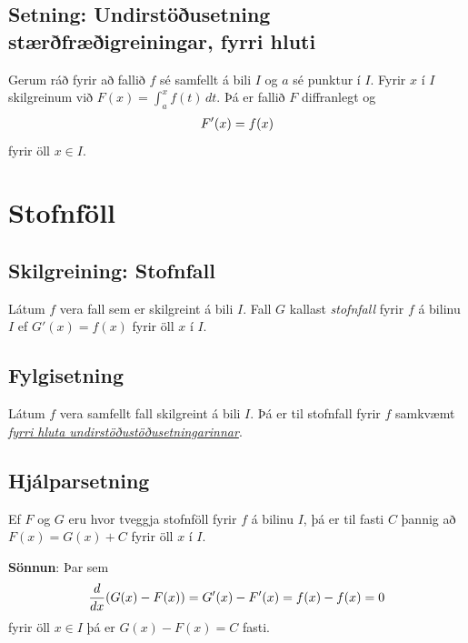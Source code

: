 \documentclass[a4paper,10pt,icelandic]{sphinxmanual}
\begin{document}

\subsection{Setning: Undirstöðusetning stærðfræðigreiningar, fyrri hluti}
\label{kafli06:undirstodusetning-fyrri}\label{kafli06:setning-undirstousetning-staerfraeigreiningar-fyrri-hluti}\label{kafli06:index-6}
Gerum ráð fyrir að fallið \(f\) sé samfellt á bili \(I\) og
\(a\) sé punktur í \(I\). Fyrir \(x\) í \(I\)
skilgreinum við \(F(x)=\int_a^x f(t)\,dt\). Þá er fallið \(F\)
diffranlegt og
\begin{gather}
\begin{split}F'(x)=f(x)\end{split}\notag
\end{gather}
fyrir öll \(x\in I\).


\section{Stofnföll}
\label{kafli06:stofnfoll}\label{kafli06:index-7}

\subsection{Skilgreining: Stofnfall}
\label{kafli06:skilgreining-stofnfall}
Látum \(f\) vera fall sem er skilgreint á bili \(I\). Fall
\(G\) kallast \textit{stofnfall} fyrir \(f\) á
bilinu \(I\) ef \(G'(x)=f(x)\) fyrir öll \(x\) í \(I\).


\subsection{Fylgisetning}
\label{kafli06:id8}
Látum \(f\) vera samfellt fall skilgreint á bili \(I\). Þá er
til stofnfall fyrir \(f\)
samkvæmt {\hyperref[kafli06:undirstodusetning\string-fyrri]{\emph{fyrri hluta undirstöðustöðusetningarinnar}}}.


\subsection{Hjálparsetning}
\label{kafli06:hjalparsetning}
Ef \(F\) og \(G\) eru hvor tveggja stofnföll fyrir \(f\) á
bilinu \(I\), þá er til fasti \(C\) þannig að
\(F(x)=G(x)+C\) fyrir öll \(x\) í \(I\).

\textbf{Sönnun}: Þar sem
\begin{gather}
\begin{split}\frac{d}{dx}(G(x) - F(x)) = G'(x) - F'(x) = f(x) - f(x) = 0\end{split}\notag
\end{gather}
fyrir öll \(x\in I\) þá er \(G(x)-F(x) = C\) fasti.
\end{document}
